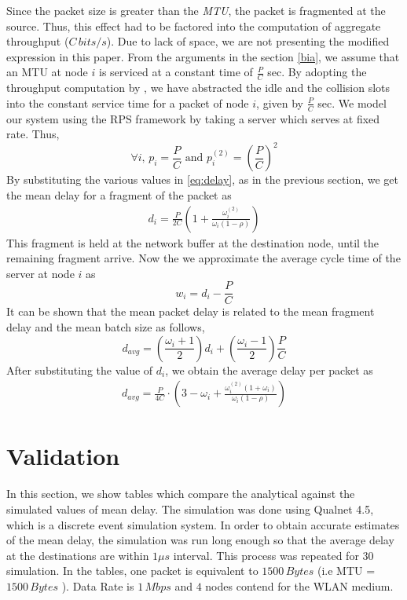 \documentclass[10pt, conference, compsocconf]{IEEEtran}
\begin{document}
Since the packet size is greater than the \textit{MTU}, the packet is fragmented at the source.  Thus, this effect had to be factored into the computation of aggregate throughput ($C\, bits/s$). Due to lack of space, we are not presenting the modified expression in this paper. From the arguments in the section \ref{bia}, we assume  that an MTU at node $i$ is serviced at a constant time of $\frac{P}{C}$ sec\footnotemark {}. By adopting the throughput computation by \cite{bianchi}, we have abstracted the idle and the collision slots into the constant service time for a packet of node $i$, given by $\frac{P}{C}$ sec. We model our system using the RPS framework by taking a server which serves at fixed rate. Thus,
$$\forall i,\, p_i = \frac{P}{C}  	 \textrm{ and } p^{(2)}_i = \left(\frac{P}{C}\right)^2$$
By substituting the various values in \eqref{eq:delay}, as in the previous section, we get the mean delay for a fragment of the packet as 
\begin{eqnarray} \label{eq:delay1}
d_i =   \frac{P}{2C}\left(1 + \frac{\omega^{(2)}_i}{\omega_i(1-\rho)} \right)
\end{eqnarray}
This fragment is held at the network buffer at the destination node, until the remaining fragment arrive. Now the we approximate the average cycle time of the server at node $i$ as
$$  w_i = d_i - \frac{P}{C}$$
It can be shown that the mean packet delay is related to the mean fragment delay and the mean batch size as follows,
$$d_{avg} = \left( \frac{\omega_i+1}{2} \right)d_i+ \left(\frac{\omega_i-1}{2} \right)\frac{P}{C}$$
After substituting the value of $d_i$, we obtain the average delay per packet as
\begin{eqnarray} \label{eq:delay2}
d_{avg} = \frac{P}{4C} \cdot \left(3 - \omega_i + \frac{\omega^{(2)}_i(1+\omega_i)}{\omega_i(1-\rho)} \right)
\end{eqnarray}

\section{\large{Validation}}
\label{sim}
In this section, we show tables which compare the analytical against the simulated values of mean delay. The simulation was done using Qualnet 4.5, which is a discrete event simulation system. In order to obtain accurate estimates of the mean delay, the simulation was run long enough so that the average delay at the destinations are within $1 \mu s$ interval. This process was repeated for $30$ simulation. In the tables, one packet is equivalent to $1500\, Bytes$ (i.e MTU = $1500\, Bytes$ ). Data Rate is $1 \, Mbps$ and  $4$ nodes contend for the WLAN medium.
\end{document}

